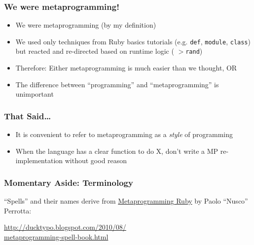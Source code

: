 \documentclass[slidestop,compress,mathserif]{beamer}
\begin{document}
\begin{frame}
	\frametitle{We were metaprogramming!}
	\begin{itemize}
		\item We were metaprogramming (by my definition)
		\pause
		\item We used only techniques from Ruby basics tutorials (e.g. \texttt{def},
\texttt{module}, \texttt{class}) but reacted and re-directed based on runtime
logic ( \texttt{$>$rand})
		\pause
		\item Therefore:  Either metaprogramming is much easier than we thought, OR
		\pause
		\item The difference between ``programming'' and ``metaprogramming'' is unimportant
	\end{itemize}
\end{frame}

\begin{frame}
	\frametitle{That Said\ldots}
	\begin{itemize}
		\item It is convenient to refer to metaprogramming as a \emph{style} of programming
		\item When the language has a clear function to do X, don't write a MP re-implementation without good reason
	\end{itemize}
\end{frame}

\begin{frame}
	\frametitle{Momentary Aside: Terminology}
	``Spells'' and their names derive from \underline{Metaprogramming Ruby} by Paolo ``Nusco'' Perrotta:
	\vskip 0.5cm
	\begin{center}
		\underline{http://ducktypo.blogspot.com/2010/08/} \\
		\underline{metaprogramming-spell-book.html}
	\end{center}
\end{frame}
\end{document}
